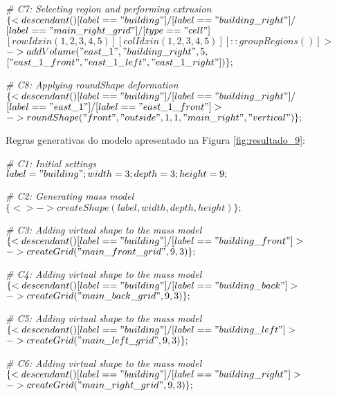 \noindent \textit{\# C7: Selecting region and performing extrusion}\\
$\{< descendant() [label=="building"] / [label=="building\_right"] / $\\
$[label=="main\_right\_grid"] / [type=="cell"] $\\
$[rowIdx in (1, 2, 3, 4, 5)] [colIdx in (1, 2, 3, 4, 5)] [::groupRegions()] > $\\
$-> addVolume("east\_1", "building\_right", 5, $\\
$["east\_1\_front", "east\_1\_left", "east\_1\_right"])\};$

\noindent \textit{\# C8: Applying roundShape deformation}\\
$\{< descendant() [label=="building"] / [label=="building\_right"] / $\\
$[label=="east\_1"] / [label=="east\_1\_front"] > $\\
$-> roundShape("front", "outside", 1, 1, "main\_right", "vertical")\};$

\vspace{1cm}

Regras generativas do modelo apresentado na Figura \ref{fig:resultado_9}:

\noindent \textit{\# C1: Initial settings}\\
$label = "building"; width = 3; depth = 3; height = 9;$

\noindent \textit{\# C2: Generating mass model}\\
$\{<> -> createShape(label, width, depth, height)\};$

\noindent \textit{\# C3: Adding virtual shape to the mass model}\\
$\{< descendant() [label=="building"] / [label=="building\_front"] > $\\
$-> createGrid("main\_front\_grid", 9, 3)\};$

\noindent \textit{\# C4: Adding virtual shape to the mass model}\\
$\{< descendant() [label=="building"] / [label=="building\_back"] > $\\
$-> createGrid("main\_back\_grid", 9, 3)\};$

\noindent \textit{\# C5: Adding virtual shape to the mass model}\\
$\{< descendant() [label=="building"] / [label=="building\_left"] > $\\
$-> createGrid("main\_left\_grid", 9, 3)\};$

\noindent \textit{\# C6: Adding virtual shape to the mass model}\\
$\{< descendant() [label=="building"] / [label=="building\_right"] > $\\
$-> createGrid("main\_right\_grid", 9, 3)\};$

